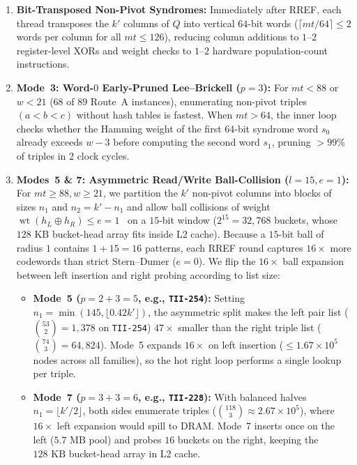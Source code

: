 \documentclass[11pt,a4paper]{article}
\theoremstyle{definition}
\theoremstyle{remark}
\newcommand{\wt}{\operatorname{wt}}
\begin{document}
\begin{enumerate}[leftmargin=2em]
    \item \textbf{Bit-Transposed Non-Pivot Syndromes:}
    Immediately after RREF, each thread transposes the $k'$ columns of $Q$ into vertical $64$-bit words ($\lceil mt / 64 \rceil \le 2$ words per column for all $mt \le 126$), reducing column additions to $1\text{--}2$ register-level XORs and weight checks to $1\text{--}2$ hardware population-count instructions.
    \item \textbf{Mode~3: Word-$0$ Early-Pruned Lee--Brickell ($p = 3$):}
    For $mt < 88$ or $w < 21$ ($68$ of $89$ Route~A instances), enumerating non-pivot triples $(a < b < c)$ without hash tables is fastest. When $mt > 64$, the inner loop checks whether the Hamming weight of the first $64$-bit syndrome word $s_0$ already exceeds $w - 3$ before computing the second word $s_1$, pruning $>99\%$ of triples in $2$ clock cycles.
    \item \textbf{Modes~5 \& 7: Asymmetric Read/Write Ball-Collision ($l = 15, e = 1$):}
    For $mt \ge 88, w \ge 21$, we partition the $k'$ non-pivot columns into blocks of sizes $n_1$ and $n_2 = k' - n_1$ and allow ball collisions of weight $\wt(h_L \oplus h_R) \le e = 1$~\cite{BLP11} on a $15$-bit window ($2^{15} = 32{,}768$ buckets, whose $128\text{ KB}$ bucket-head array fits inside L2 cache). Because a $15$-bit ball of radius $1$ contains $1 + 15 = 16$ patterns, each RREF round captures $16\times$ more codewords than strict Stern--Dumer ($e = 0$). We flip the $16\times$ ball expansion between left insertion and right probing according to list size:
    \begin{itemize}[leftmargin=1.5em]
        \item \textbf{Mode~5 ($p = 2 + 3 = 5$, e.g., \texttt{TII-254}):}
        Setting $n_1 = \min(145, \lfloor 0.42 k' \rfloor)$, the asymmetric split makes the left pair list ($\binom{53}{2} = 1{,}378$ on \texttt{TII-254}) $47\times$ smaller than the right triple list ($\binom{74}{3} = 64{,}824$). Mode~5 expands $16\times$ on left insertion ($\le 1.67 \times 10^5$ nodes across all families), so the hot right loop performs a single lookup per triple.
        \item \textbf{Mode~7 ($p = 3 + 3 = 6$, e.g., \texttt{TII-228}):}
        With balanced halves $n_1 = \lfloor k'/2 \rfloor$, both sides enumerate triples ($\binom{118}{3} \approx 2.67 \times 10^5$), where $16\times$ left expansion would spill to DRAM. Mode~7 inserts once on the left ($5.7\text{ MB}$ pool) and probes $16$ buckets on the right, keeping the $128\text{ KB}$ bucket-head array in L2 cache.

\end{itemize}
\end{enumerate}
\end{document}
